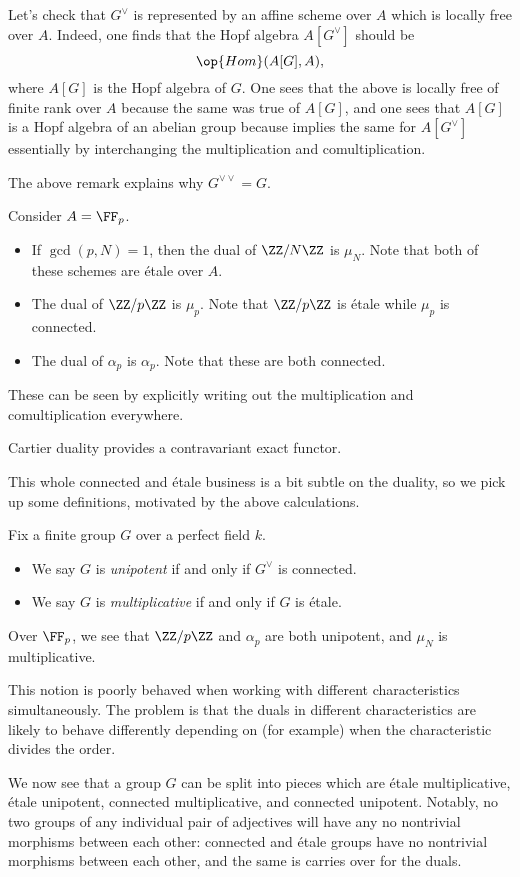 \documentclass[../notes.tex]{subfiles}
\begin{document}
\begin{remark}
	Let's check that $G^\lor$ is represented by an affine scheme over $A$ which is locally free over $A$. Indeed, one finds that the Hopf algebra $A[G^\lor]$ should be
	\[\op{Hom}(A[G],A),\]
	where $A[G]$ is the Hopf algebra of $G$. One sees that the above is locally free of finite rank over $A$ because the same was true of $A[G]$, and one sees that $A[G]$ is a Hopf algebra of an abelian group because implies the same for $A[G^\lor]$ essentially by interchanging the multiplication and comultiplication.
\end{remark}
\begin{remark}
	The above remark explains why $G^{\lor\lor}=G$.
\end{remark}
\begin{example}
	Consider $A=\FF_p$.
	\begin{itemize}
		\item If $\gcd(p,N)=1$, then the dual of ${\ZZ/N\ZZ}$ is ${\mu_N}$. Note that both of these schemes are \'etale over $A$.
		\item The dual of $\ZZ/p\ZZ$ is $\mu_p$. Note that $\ZZ/p\ZZ$ is \'etale while $\mu_p$ is connected.
		\item The dual of $\alpha_p$ is $\alpha_p$. Note that these are both connected.
	\end{itemize}
	These can be seen by explicitly writing out the multiplication and comultiplication everywhere.
\end{example}
\begin{remark}
	Cartier duality provides a contravariant exact functor.
\end{remark}
This whole connected and \'etale business is a bit subtle on the duality, so we pick up some definitions, motivated by the above calculations.
\begin{definition}
	Fix a finite group $G$ over a perfect field $k$.
	\begin{itemize}
		\item We say $G$ is \textit{unipotent} if and only if $G^\lor$ is connected.
		\item We say $G$ is \textit{multiplicative} if and only if $G$ is \'etale.
	\end{itemize}
\end{definition}
\begin{example}
	Over $\FF_p$, we see that $\ZZ/p\ZZ$ and $\alpha_p$ are both unipotent, and $\mu_N$ is multiplicative.
\end{example}
\begin{remark}
	This notion is poorly behaved when working with different characteristics simultaneously. The problem is that the duals in different characteristics are likely to behave differently depending on (for example) when the characteristic divides the order.
\end{remark}
We now see that a group $G$ can be split into pieces which are \'etale multiplicative, \'etale unipotent, connected multiplicative, and connected unipotent. Notably, no two groups of any individual pair of adjectives will have any no nontrivial morphisms between each other: connected and \'etale groups have no nontrivial morphisms between each other, and the same is carries over for the duals.
\end{document}
